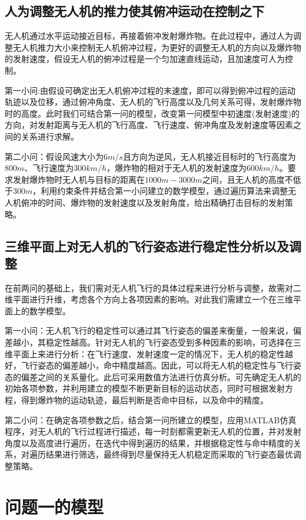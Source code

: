 \documentclass[normalsize]{ctexart}
\begin{document}
\subsection{人为调整无人机的推力使其俯冲运动在控制之下}
无人机通过水平运动接近目标，再接着俯冲发射爆炸物。在此过程中，通过人为调整无人机推力大小来控制无人机俯冲过程，为更好的调整无人机的方向以及爆炸物的发射速度，假设无人机的俯冲过程是一个匀加速直线运动，且加速度可人为控制。
\par 第一小问:由假设可确定出无人机俯冲过程的末速度，即可以得到俯冲过程的运动轨迹以及位移，通过俯冲角度、无人机的飞行高度以及几何关系可得，发射爆炸物时的高度。此时我们可结合第一问的模型，改变第一问模型中初速度(发射速度)的方向，对发射距离与无人机的飞行高度、飞行速度、俯冲角度及发射速度等因素之间的关系进行求解。
\par 第二小问：假设风速大小为$6m/s$且方向为逆风，无人机接近目标时的飞行高度为$800m$、飞行速度为$300km/h$，爆炸物的相对于无人机的发射速度为$600km/h$。要求发射爆炸物时无人机与目标的距离在$1000 m-3000 m$之间，且无人机的高度不低于$300m$，利用约束条件并结合第一小问建立的数学模型，通过遍历算法来调整无人机俯冲的时间、爆炸物的发射速度以及发射角度，给出精确打击目标的发射策略。
\subsection{三维平面上对无人机的飞行姿态进行稳定性分析以及调整}
在前两问的基础上，我们需对无人机飞行的具体过程来进行分析与调整，故需对二维平面进行升维，考虑各个方向上各项因素的影响。对此我们需建立一个在三维平面上的数学模型。
\par 第一小问：无人机飞行的稳定性可以通过其飞行姿态的偏差来衡量，一般来说，偏差越小，其稳定性越高。针对无人机的飞行姿态受到多种因素的影响，可选择在三维平面上来进行分析：在飞行速度、发射速度一定的情况下，无人机的稳定性越好，飞行姿态的偏差越小，命中精度越高。因此，可以将无人机的稳定性与飞行姿态的偏差之间的关系量化。此后可采用数值方法进行仿真分析。可先确定无人机的初始各项参数，并利用建立的模型不断更新目标的运动状态，同时可根据发射方程，得到爆炸物的运动轨迹，最后判断是否命中目标，以及命中的精度。
\par 第二小问：在确定各项参数之后，结合第一问所建立的模型，应用MATLAB仿真程序，对无人机的飞行过程进行描述，每一时刻都需更新无人机的位置，并对发射角度以及高度进行遍历，在迭代中得到遍历的结果，并根据稳定性与命中精度的关系，对遍历结果进行筛选，最终得到尽量保持无人机稳定而采取的飞行姿态最优调整策略。
	\section{问题一的模型}
\end{document}
